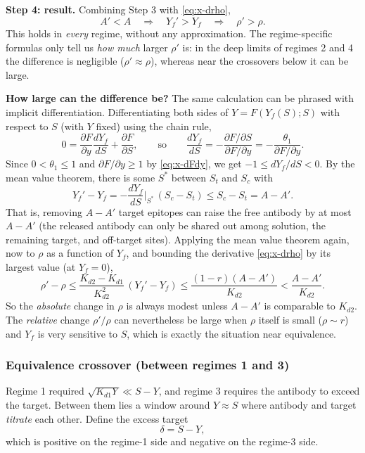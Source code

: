 \textbf{Step 4: result.} Combining Step 3 with \eqref{eq:x-drho},
\begin{equation}
A'<A
\quad\Longrightarrow\quad
Y_f'>Y_f
\quad\Longrightarrow\quad
\rho'>\rho.
\label{eq:x-mono}
\end{equation}
This holds in \emph{every} regime, without any approximation. The
regime-specific formulas only tell us \emph{how much} larger $\rho'$ is:
in the deep limits of regimes 2 and 4 the difference is negligible
($\rho'\approx\rho$), whereas near the crossovers below it can be large.

\textbf{How large can the difference be?} The same calculation can be
phrased with implicit differentiation. Differentiating both sides of
$Y=F(Y_f(S);S)$ with respect to $S$ (with $Y$ fixed) using the chain rule,
$$
0=\frac{\partial F}{\partial y}\frac{dY_f}{dS}+\frac{\partial F}{\partial S},
\qquad\text{so}\qquad
\frac{dY_f}{dS}
=-\frac{\partial F/\partial S}{\partial F/\partial y}
=-\frac{\theta_1}{\partial F/\partial y}.
$$
Since $0<\theta_1\le1$ and $\partial F/\partial y\ge1$ by
\eqref{eq:x-dFdy}, we get $-1\le dY_f/dS<0$. By the mean value theorem,
there is some $S^*$ between $S_t$ and $S_c$ with
$$
Y_f'-Y_f
=-\frac{dY_f}{dS}\bigg|_{S^*}\,(S_c-S_t)
\le S_c-S_t
=A-A'.
$$
That is, removing $A-A'$ target epitopes can raise the free antibody by at
most $A-A'$ (the released antibody can only be shared out among solution,
the remaining target, and off-target sites). Applying the mean value
theorem again, now to $\rho$ as a function of $Y_f$, and bounding the
derivative \eqref{eq:x-drho} by its largest value (at $Y_f=0$),
\begin{equation}
\rho'-\rho
\le\frac{K_{d2}-K_{d1}}{K_{d2}^2}\,(Y_f'-Y_f)
\le\frac{(1-r)(A-A')}{K_{d2}}
<\frac{A-A'}{K_{d2}}.
\label{eq:x-bound}
\end{equation}
So the \emph{absolute} change in $\rho$ is always modest unless
$A-A'$ is comparable to $K_{d2}$. The \emph{relative} change
$\rho'/\rho$ can nevertheless be large when $\rho$ itself is small
($\rho\sim r$) and $Y_f$ is very sensitive to $S$, which is exactly the
situation near equivalence.

\subsubsection{Equivalence crossover (between regimes 1 and 3)}

Regime 1 required $\sqrt{K_{d1}Y}\ll S-Y$, and regime 3 requires the
antibody to exceed the target. Between them lies a window around
$Y\approx S$ where antibody and target \emph{titrate} each other. Define
the excess target
$$
\delta=S-Y,
$$
which is positive on the regime-1 side and negative on the regime-3 side.

